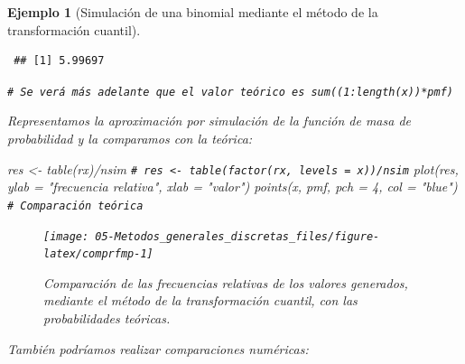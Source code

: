 \documentclass[
]{book}
\newenvironment{Shaded}{\begin{snugshade}}{\end{snugshade}}
\newcommand{\AttributeTok}[1]{\textcolor[rgb]{0.77,0.63,0.00}{#1}}
\newcommand{\CommentTok}[1]{\textcolor[rgb]{0.56,0.35,0.01}{\textit{#1}}}
\newcommand{\DecValTok}[1]{\textcolor[rgb]{0.00,0.00,0.81}{#1}}
\newcommand{\FunctionTok}[1]{\textcolor[rgb]{0.00,0.00,0.00}{#1}}
\newcommand{\NormalTok}[1]{#1}
\newcommand{\OtherTok}[1]{\textcolor[rgb]{0.56,0.35,0.01}{#1}}
\newcommand{\SpecialCharTok}[1]{\textcolor[rgb]{0.00,0.00,0.00}{#1}}
\newcommand{\StringTok}[1]{\textcolor[rgb]{0.31,0.60,0.02}{#1}}
\theoremstyle{break}
\newtheorem{example}{Ejemplo}[chapter]
\theoremstyle{nonumberplain}
\renewcommand{\CommentTok}[1]{\textcolor[rgb]{0.41,0.41,0.41}{\texttt{#1}}}
\begin{document}
\begin{example}[Simulación de una binomial mediante el método de la transformación cuantil]
\begin{verbatim}
 ## [1] 5.99697
\end{verbatim}

\begin{Shaded}
\begin{Highlighting}[]
\CommentTok{\# Se verá más adelante que el valor teórico es sum((1:length(x))*pmf)}
\end{Highlighting}
\end{Shaded}

Representamos la aproximación por simulación de la función de masa de probabilidad y la comparamos con la teórica:

\begin{Shaded}
\begin{Highlighting}[]
\NormalTok{res }\OtherTok{\textless{}{-}} \FunctionTok{table}\NormalTok{(rx)}\SpecialCharTok{/}\NormalTok{nsim}
\CommentTok{\# res \textless{}{-} table(factor(rx, levels = x))/nsim}
\FunctionTok{plot}\NormalTok{(res, }\AttributeTok{ylab =} \StringTok{"frecuencia relativa"}\NormalTok{, }\AttributeTok{xlab =} \StringTok{"valor"}\NormalTok{)}
\FunctionTok{points}\NormalTok{(x, pmf, }\AttributeTok{pch =} \DecValTok{4}\NormalTok{, }\AttributeTok{col =} \StringTok{"blue"}\NormalTok{)  }\CommentTok{\# Comparación teórica}
\end{Highlighting}
\end{Shaded}

\begin{figure}[!htb]

{\centering \texttt{[image: 05-Metodos\_generales\_discretas\_files/figure-latex/comprfmp-1]} 

}

\caption{Comparación de las frecuencias relativas de los valores generados, mediante el método de la transformación cuantil, con las probabilidades teóricas.}\label{fig:comprfmp}
\end{figure}

También podríamos realizar comparaciones numéricas:

\begin{Shaded}
\end{Shaded}


\end{example}
\end{document}
